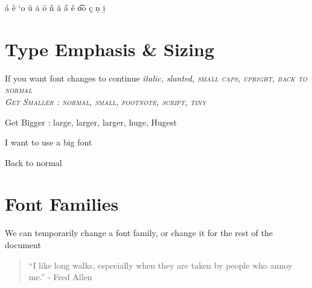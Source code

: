 \documentclass[a4paper,12pt]{book}
\begin{document}
 
 
 
 
\'{a} \^{e} `{o} \"{u} \.{a} \={o} \~{n} \u{a} \H{a} \v{e} \t{oo} \c{c} \d{n} \b{i}
 
 
 
 
 
 
 
 
\section[Type]{\textsf{Type Emphasis \& Sizing}} \label{sec:typeemp}
 
If you want font changes to continue \itshape italic, \slshape slanted, \scshape small caps, \upshape upright, \normalfont back to normal\\
 
 
Get Smaller : \normalsize{normal}, \small{small}, \footnotesize{footnote}, \scriptsize{script}, \tiny{tiny}
 
Get Bigger : \large{large}, \Large{larger}, \LARGE{larger}, \huge{huge}, \Huge{Hugest}
 
 
\begin{LARGE}
I want to use a big font
\end{LARGE}
 
\normalsize{Back to normal}
 
\section{\textsf{Font Families}}
We can {\sffamily temporarily change} a font family, \ttfamily or change it for the rest of the document \sffamily
 
 
\begin{quote}
``I like long walks, especially when they are taken by people who annoy me.'' 
- Fred Allen
\end{quote} 
 
\end{document}
